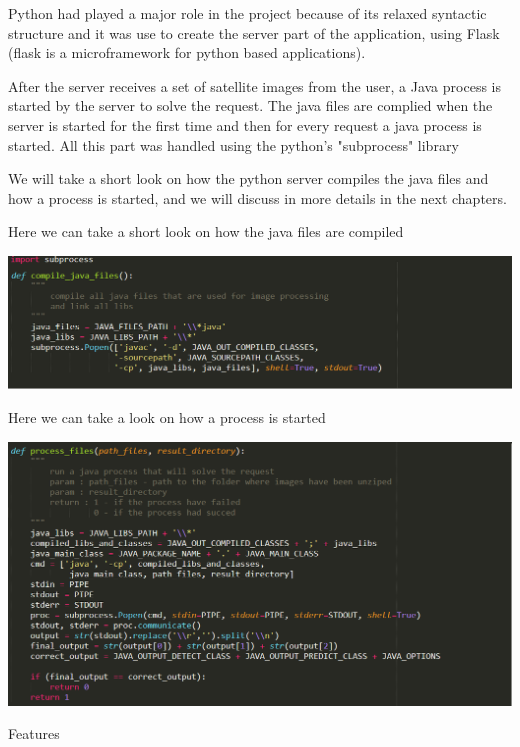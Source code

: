 \documentclass[12pt, a4paper]{report}
\begin{document}
Python had played a major role in the project because of its relaxed syntactic structure and it was use to create the server part of the application, using Flask (flask is a microframework for python based applications).
\par 

After the server receives a set of satellite images from the user, a Java process is started by the server to solve the request. The java files are complied when the server is started for the first time and then for every request a java process is started. All this part was handled using the python's "subprocess" library
\par
\medskip

We will take a short look on how the python server compiles the java files and how a process is started, and we will discuss in more details in the next chapters.
\medskip

Here we can take a short look on how the java files are compiled
\par
\medskip
\includegraphics[scale=0.6]{python_call_java_1.png}
\bigskip

Here we can take a look on how a process is started
\par
\medskip
\includegraphics[scale=0.6]{python_call_java_2.png}



{\Large Features\par}
\end{document}
